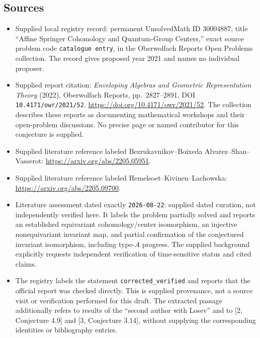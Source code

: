 \documentclass[11pt]{article}
\begin{document}
\subsection{Sources}
\begin{itemize}
\item Supplied local registry record: permanent UnsolvedMath ID \(30004887\), title ``Affine Springer Cohomology and Quantum-Group Centers,'' exact source problem code \texttt{catalogue entry}, in the Oberwolfach Reports Open Problems collection. The record gives proposed year 2021 and names no individual proposer.
\item Supplied report citation: \emph{Enveloping Algebras and Geometric Representation Theory} (2022), Oberwolfach Reports, pp.\ 2827--2891, DOI \texttt{10.4171/owr/2021/52}. \url{https://doi.org/10.4171/owr/2021/52}. The collection describes these reports as documenting mathematical workshops and their open-problem discussions. No precise page or named contributor for this conjecture is supplied.
\item Supplied literature reference labeled Bezrukavnikov--Boixeda Alvarez--Shan--Vasserot: \url{https://arxiv.org/abs/2205.05951}.
\item Supplied literature reference labeled Hemelsoet--Kivinen--Lachowska: \url{https://arxiv.org/abs/2205.09700}.
\item Literature assessment dated exactly \texttt{2026-08-22}: supplied dated curation, not independently verified here. It labels the problem partially solved and reports an established equivariant cohomology/center isomorphism, an injective nonequivariant invariant map, and partial confirmation of the conjectured invariant isomorphism, including type-\(A\) progress. The supplied background explicitly requests independent verification of time-sensitive status and cited claims.
\item The registry labels the statement \texttt{corrected\_verified} and reports that the official report was checked directly. This is supplied provenance, not a source visit or verification performed for this draft. The extracted passage additionally refers to results of the ``second author with Losev'' and to [2, Conjecture 4.9] and [3, Conjecture 3.14], without supplying the corresponding identities or bibliography entries.
\end{itemize}
\end{document}
